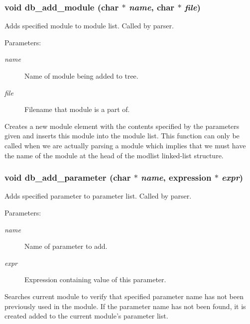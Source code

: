 \subsubsection{\setlength{\rightskip}{0pt plus 5cm}void db\_\-add\_\-module (char $\ast$ {\em name}, char $\ast$ {\em file})}\label{db_8h_a3}


Adds specified module to module list. Called by parser.

\begin{Desc}
\item[Parameters: ]\par
\begin{description}
\item[{\em 
name}]Name of module being added to tree. \item[{\em 
file}]Filename that module is a part of.\end{description}
\end{Desc}
Creates a new module element with the contents specified by the parameters given and inserts this module into the module list. This function can only be called when we are actually parsing a module which implies that we must have the name of the module at the head of the modlist linked-list structure. 
\subsubsection{\setlength{\rightskip}{0pt plus 5cm}void db\_\-add\_\-parameter (char $\ast$ {\em name}, {\bf expression} $\ast$ {\em expr})}\label{db_8h_a5}


Adds specified parameter to parameter list. Called by parser.

\begin{Desc}
\item[Parameters: ]\par
\begin{description}
\item[{\em 
name}]Name of parameter to add. \item[{\em 
expr}]Expression containing value of this parameter.\end{description}
\end{Desc}
Searches current module to verify that specified parameter name has not been previously used in the module. If the parameter name has not been found, it is created added to the current module's parameter list. 
